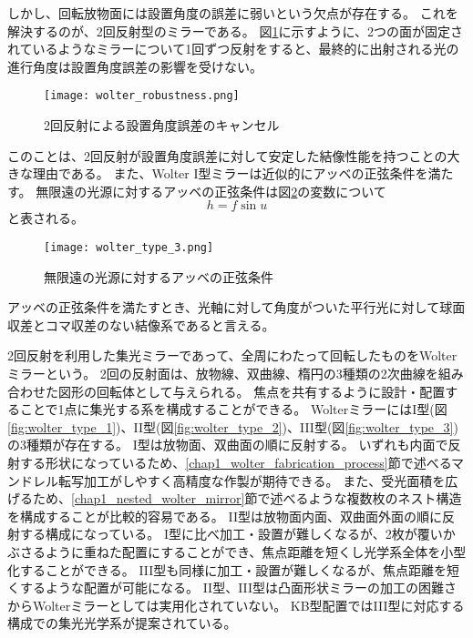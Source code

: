 しかし、回転放物面には設置角度の誤差に弱いという欠点が存在する。
これを解決するのが、2回反射型のミラーである。
図\ref{fig:wolter_robustness}に示すように、2つの面が固定されているようなミラーについて1回ずつ反射をすると、最終的に出射される光の進行角度は設置角度誤差の影響を受けない。

\begin{figure}[b]
\centering
\texttt{[image: wolter\_robustness.png]}
\caption{2回反射による設置角度誤差のキャンセル}
\label{fig:wolter_robustness}
\end{figure}

このことは、2回反射が設置角度誤差に対して安定した結像性能を持つことの大きな理由である。
また、Wolter I型ミラーは近似的にアッベの正弦条件を満たす。
無限遠の光源に対するアッベの正弦条件は図\ref{fig:abbe_sine_condition_for_parallel_light}の変数について
\[
    h = f \sin u
\]
と表される。


\begin{figure}[b]
\centering
\texttt{[image: wolter\_type\_3.png]}
\caption{無限遠の光源に対するアッベの正弦条件}
\label{fig:abbe_sine_condition_for_parallel_light}
\end{figure}

アッベの正弦条件を満たすとき、光軸に対して角度がついた平行光に対して球面収差とコマ収差のない結像系であると言える。

2回反射を利用した集光ミラーであって、全周にわたって回転したものをWolterミラーという。
2回の反射面は、放物線、双曲線、楕円の3種類の2次曲線を組み合わせた図形の回転体として与えられる。
焦点を共有するように設計・配置することで1点に集光する系を構成することができる。
WolterミラーにはI型(図\ref{fig:wolter_type_1})、II型(図\ref{fig:wolter_type_2})、III型(図\ref{fig:wolter_type_3})の3種類が存在する。
I型は放物面、双曲面の順に反射する。
いずれも内面で反射する形状になっているため、\ref{chap1_wolter_fabrication_process}節で述べるマンドレル転写加工がしやすく高精度な作製が期待できる。
また、受光面積を広げるため、\ref{chap1_nested_wolter_mirror}節で述べるような複数枚のネスト構造を構成することが比較的容易である。
II型は放物面内面、双曲面外面の順に反射する構成になっている。
I型に比べ加工・設置が難しくなるが、2枚が覆いかぶさるように重ねた配置にすることができ、焦点距離を短くし光学系全体を小型化することができる。
III型も同様に加工・設置が難しくなるが、焦点距離を短くするような配置が可能になる。
II型、III型は凸面形状ミラーの加工の困難さからWolterミラーとしては実用化されていない。
KB型配置ではIII型に対応する構成での集光光学系が提案されている。\cite{Yamada:20}

